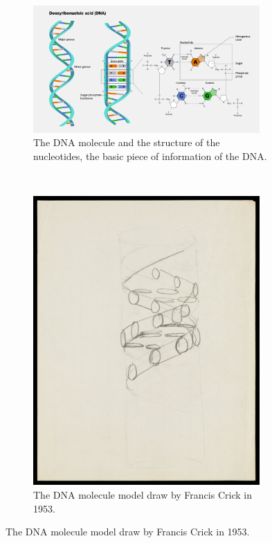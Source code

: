 \begin{figure}[h!]
	\centering
	\begin{subfigure}[b]{0.75\textwidth}
		\centering
		\includegraphics[width=0.95\textwidth]{figures/background/DNA_2024a.jpg}
		\caption[The DNA molecule]{The DNA molecule and the structure of the nucleotides, the basic piece of information of the DNA.} 
	\end{subfigure}%
	\\
	\begin{subfigure}[b]{0.75\textwidth}
		\centering
		\includegraphics[width=0.95\textwidth]{figures/background/DNA_sketch.jpg}
		\caption[The DNA sketch by Crick]{The DNA molecule model draw by Francis Crick in 1953.} 
	\end{subfigure}%
\label{fig:DNA}
\end{figure}

